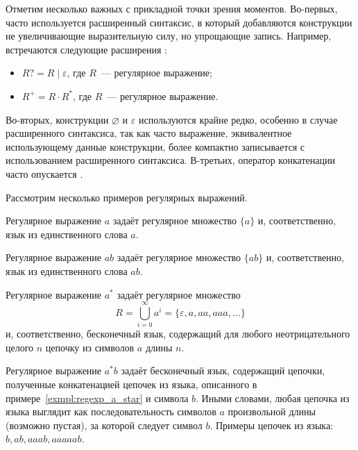 Отметим несколько важных с прикладной точки зрения моментов.
Во-первых, часто используется расширенный синтаксис, в который добавляются конструкции не увеличивающие выразительную силу, но упрощающие запись.
Например, встречаются следующие расширения%
:
\begin{itemize}
    \item $R? = R \mid \varepsilon$, где $R$~--- регулярное выражение;
    \item $R^+ = R \cdot R^*$, где $R$~--- регулярное выражение.
\end{itemize}

Во-вторых, конструкции $\varnothing$ и $\varepsilon$ используются крайне редко, особенно в случае расширенного синтаксиса, так как часто выражение, эквивалентное использующему данные конструкции, более компактно записывается с использованием расширенного синтаксиса.
В-третьих, оператор конкатенации часто опускается%
.

Рассмотрим несколько примеров регулярных выражений.
\begin{example}
    Регулярное выражение $a$ задаёт регулярное множество $\{a\}$ и, соответственно, язык из единственного слова $a$.
\end{example}


\begin{example}
    Регулярное выражение $ab$ задаёт регулярное множество $\{ab\}$ и, соответственно, язык из единственного слова $ab$.
\end{example}


\begin{example}\label{exmpl:regexp_a_star}
    Регулярное выражение $a^*$ задаёт регулярное множество \[R = \bigcup_{i=0}^{\infty}{a^i} = \{\varepsilon, a, aa, aaa, \ldots \}\] и, соответственно, бесконечный язык, содержащий для любого неотрицательного целого $n$ цепочку из символов $a$ длины $n$.
\end{example}

\begin{example}
    Регулярное выражение $a^*b$ задаёт бесконечный язык, содержащий цепочки, полученные конкатенацией цепочек из языка, описанного в примере~\ref{exmpl:regexp_a_star} и символа $b$.
    Иными словами, любая цепочка из языка выглядит как последовательность символов $a$ произвольной длины (возможно пустая), за которой следует символ $b$.
    Примеры цепочек из языка: $b, ab, aaab, aaaaab$.
\end{example}

